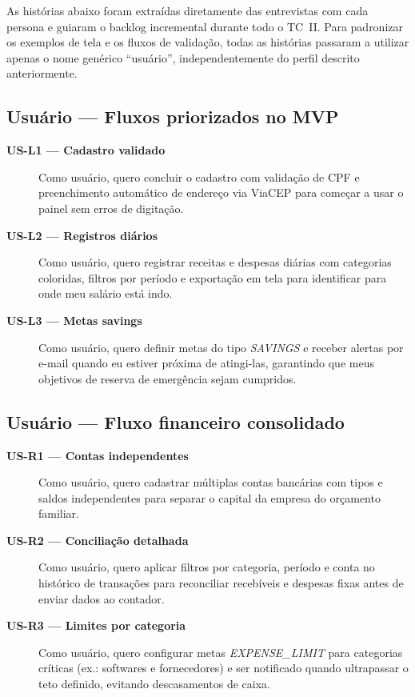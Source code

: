 As histórias abaixo foram extraídas diretamente das entrevistas com cada persona e guiaram o backlog incremental durante todo o TC~II. Para padronizar os exemplos de tela e os fluxos de validação, todas as histórias passaram a utilizar apenas o nome genérico ``usuário'', independentemente do perfil descrito anteriormente.

\subsection{Usuário — Fluxos priorizados no MVP}
\begin{description}
    \item[\textbf{US-L1 — Cadastro validado}] Como usuário, quero concluir o cadastro com validação de CPF e preenchimento automático de endereço via ViaCEP para começar a usar o painel sem erros de digitação.
    \item[\textbf{US-L2 — Registros diários}] Como usuário, quero registrar receitas e despesas diárias com categorias coloridas, filtros por período e exportação em tela para identificar para onde meu salário está indo.
    \item[\textbf{US-L3 — Metas savings}] Como usuário, quero definir metas do tipo \textit{SAVINGS} e receber alertas por e-mail quando eu estiver próxima de atingi-las, garantindo que meus objetivos de reserva de emergência sejam cumpridos.
\end{description}

\subsection{Usuário — Fluxo financeiro consolidado}
\begin{description}
    \item[\textbf{US-R1 — Contas independentes}] Como usuário, quero cadastrar múltiplas contas bancárias com tipos e saldos independentes para separar o capital da empresa do orçamento familiar.
    \item[\textbf{US-R2 — Conciliação detalhada}] Como usuário, quero aplicar filtros por categoria, período e conta no histórico de transações para reconciliar recebíveis e despesas fixas antes de enviar dados ao contador.
    \item[\textbf{US-R3 — Limites por categoria}] Como usuário, quero configurar metas \textit{EXPENSE\_LIMIT} para categorias críticas (ex.: softwares e fornecedores) e ser notificado quando ultrapassar o teto definido, evitando descasamentos de caixa.
\end{description}

